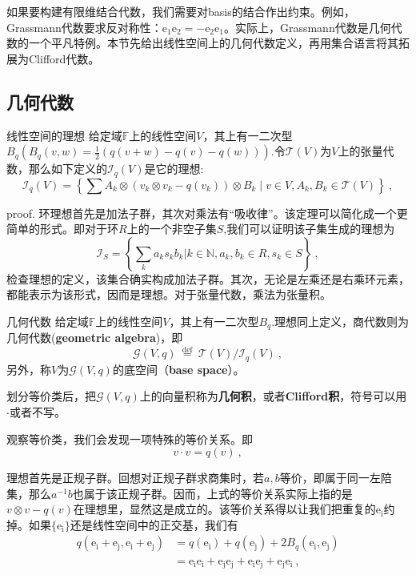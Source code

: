 
如果要构建有限维结合代数，我们需要对basis的结合作出约束。例如，Grassmann代数要求反对称性：$\mathrm {e_1e_2}=-\mathrm {e_2e_1}$。实际上，Grassmann代数是几何代数的一个平凡特例。本节先给出线性空间上的几何代数定义，再用集合语言将其拓展为Clifford代数。
\subsection{几何代数}
\begin{theorem}{线性空间的理想}
给定域$\mathbb F$上的线性空间$V$，其上有一二次型$B_q(B_q(v,w)=\frac{1}{2}(q(v+w)-q(v)-q(w)))$.令$\mathcal T(V)$为$V$上的张量代数，那么如下定义的$\mathcal {I}_q(V)$是它的理想:
\begin{equation}
\mathcal{I}_{q}(V)=\left\{\sum A_{k} \otimes(v_k \otimes v_k-q(v_k)) \otimes B_{k} \mid v \in V, A_{k}, B_{k} \in \mathcal{T}(V)\right\}~,
\end{equation}
\end{theorem}
proof.
环理想首先是加法子群，其次对乘法有“吸收律”。该定理可以简化成一个更简单的形式。即对于环$R$上的一个非空子集$S$,我们可以证明该子集生成的理想为
\begin{equation}
\mathcal {I}_S=\left\{\sum _k a_k s_kb_k|k\in \mathbb N ,a_k,b_k\in R,s_k\in S\right\}~,
\end{equation}
检查理想的定义，该集合确实构成加法子群。其次，无论是左乘还是右乘环元素，都能表示为该形式，因而是理想。对于张量代数，乘法为张量积。

\begin{definition}{几何代数}
给定域$\mathbb F$上的线性空间$V$，其上有一二次型$B_q$.理想同上定义，商代数则为几何代数(\textbf{geometric algebra})，即
\begin{equation}
\mathcal{G}(V, q) \stackrel{\text { def }}{=} \mathcal{T}(V) / \mathcal{I}_{q}(V)~,
\end{equation}
另外，称$V$为$\mathcal{G}(V, q)$的底空间（\textbf{base space}）。
\end{definition}
划分等价类后，把$\mathcal{G}(V, q)$上的向量积称为\textbf{几何积}，或者\textbf{Clifford积}，符号可以用$\cdot$或者不写。

观察等价类，我们会发现一项特殊的等价关系。即
\begin{equation}
v\cdot v=q(v)~,
\end{equation}

理想首先是正规子群。回想对正规子群求商集时，若$a,b$等价，即属于同一左陪集，那么$a^{-1}b$也属于该正规子群。因而，上式的等价关系实际上指的是
$v \otimes v-q(v)$在理想里，显然这是成立的。该等价关系得以让我们把重复的$\mathrm {e_i}$约掉。如果$\{\mathrm{e_i}\}$还是线性空间中的正交基，我们有
\begin{equation}
\begin{aligned}
q(\mathrm{e_i+e_j,e_i+e_j})&=q(\mathrm{e_i})+q(\mathrm{e_j})+2 B_q(\mathrm{e_i,e_j})\\
&=\mathrm{e_ie_i+e_je_j+e_ie_j+e_je_i}~,
\end{aligned}
\end{equation}

